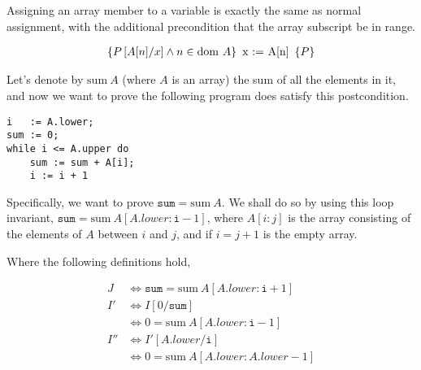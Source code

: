 \begin{definition}
  Assigning an array member to a variable is exactly the same as
  normal assignment, with the additional precondition that the array
  subscript be in range.

  \begin{align*}
    \htriple{P\left[A[n]/x\right] \land n \in \dom~A}{x := A[n]}{P}
  \end{align*}
\end{definition}

\begin{example}
  \label{exmpl:heap-sum}
  
  Let's denote by $\mathrm{sum}~A$ (where $A$ is an array) the sum of
  all the elements in it, and now we want to prove the following
  program does satisfy this postcondition.

\begin{verbatim}
i   := A.lower;
sum := 0;
while i <= A.upper do
    sum := sum + A[i];
    i := i + 1
\end{verbatim}

  Specifically, we want to prove $\mathtt{sum} = \mathrm{sum}~A$. We
  shall do so by using this loop invariant, $\mathtt{sum} =
  \mathrm{sum}~A[A.lower : \mathtt{i} - 1]$, where $A[i:j]$ is the
  array consisting of the elements of $A$ between $i$ and $j$, and if
  $i = j + 1$ is the empty array.

  \begin{prooftree}




  \end{prooftree}

  Where the following definitions hold,

  \begin{align*}
    J &\iff \mathtt{sum} = \mathrm{sum}~A[A.lower : \mathtt{i} + 1]\\
    I' &\iff I[0/\mathtt{sum}]\\
    &\iff 0 = \mathrm{sum}~A[A.lower : \mathtt{i} - 1]\\
    I'' &\iff I'[A.lower/\mathtt{i}]\\
    &\iff 0 = \mathrm{sum}~A[A.lower : A.lower - 1]
  \end{align*}
\end{example}

